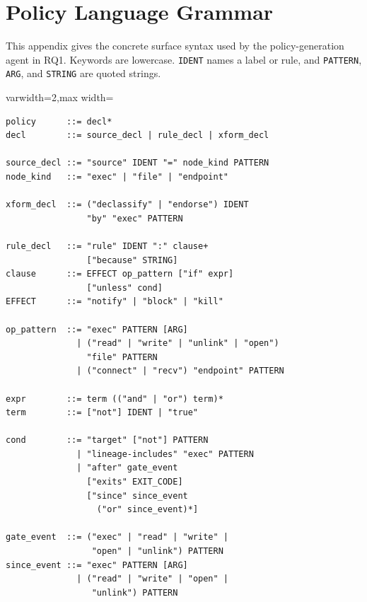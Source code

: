 \appendix

\section{Policy Language Grammar}
\label{sec:appendix:dsl-grammar}

This appendix gives the concrete surface syntax used by the policy-generation agent in RQ1.
Keywords are lowercase.
\texttt{IDENT} names a label or rule, and \texttt{PATTERN}, \texttt{ARG}, and \texttt{STRING} are quoted strings.

\begin{adjustbox}{varwidth=2\columnwidth,max width=\columnwidth}
\begin{small}
\begin{verbatim}
policy      ::= decl*
decl        ::= source_decl | rule_decl | xform_decl

source_decl ::= "source" IDENT "=" node_kind PATTERN
node_kind   ::= "exec" | "file" | "endpoint"

xform_decl  ::= ("declassify" | "endorse") IDENT
                "by" "exec" PATTERN

rule_decl   ::= "rule" IDENT ":" clause+
                ["because" STRING]
clause      ::= EFFECT op_pattern ["if" expr]
                ["unless" cond]
EFFECT      ::= "notify" | "block" | "kill"

op_pattern  ::= "exec" PATTERN [ARG]
              | ("read" | "write" | "unlink" | "open")
                "file" PATTERN
              | ("connect" | "recv") "endpoint" PATTERN

expr        ::= term (("and" | "or") term)*
term        ::= ["not"] IDENT | "true"

cond        ::= "target" ["not"] PATTERN
              | "lineage-includes" "exec" PATTERN
              | "after" gate_event
                ["exits" EXIT_CODE]
                ["since" since_event
                  ("or" since_event)*]

gate_event  ::= ("exec" | "read" | "write" |
                 "open" | "unlink") PATTERN
since_event ::= "exec" PATTERN [ARG]
              | ("read" | "write" | "open" |
                 "unlink") PATTERN
\end{verbatim}
\end{small}
\end{adjustbox}

